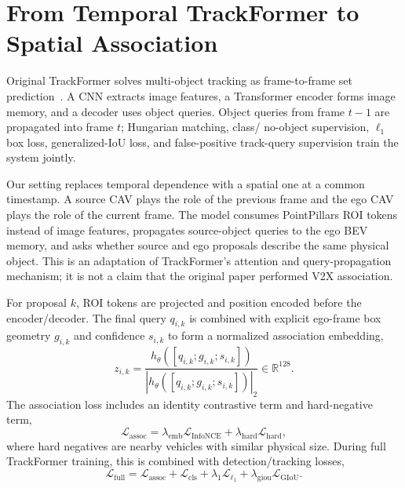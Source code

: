 \documentclass[11pt]{article}
\begin{document}
\section{From Temporal TrackFormer to Spatial Association}

Original TrackFormer solves multi-object tracking as frame-to-frame set
prediction~\cite{trackformer}. A CNN extracts image features, a Transformer
encoder forms image memory, and a decoder uses object queries. Object queries
from frame $t-1$ are propagated into frame $t$; Hungarian matching, class/
no-object supervision, $\ell_1$ box loss, generalized-IoU loss, and
false-positive track-query supervision train the system jointly.

Our setting replaces temporal dependence with a spatial one at a common
timestamp. A source CAV plays the role of the previous frame and the ego CAV
plays the role of the current frame. The model consumes PointPillars ROI tokens
instead of image features, propagates source-object queries to the ego BEV
memory, and asks whether source and ego proposals describe the same physical
object. This is an adaptation of TrackFormer's attention and query-propagation
mechanism; it is not a claim that the original paper performed V2X association.

For proposal $k$, ROI tokens are projected and position encoded before the
encoder/decoder. The final query $q_{i,k}$ is combined with explicit ego-frame
box geometry $g_{i,k}$ and confidence $s_{i,k}$ to form a normalized
association embedding,
\begin{equation}
 z_{i,k} = \frac{h_\theta([q_{i,k};g_{i,k};s_{i,k}])}
 {|h_\theta([q_{i,k};g_{i,k};s_{i,k}])|_2}\in\mathbb{R}^{128}.
\end{equation}
The association loss includes an identity contrastive term and hard-negative
term,
\begin{equation}
 \mathcal{L}_{\mathrm{assoc}} =
 \lambda_{\mathrm{emb}}\mathcal{L}_{\mathrm{InfoNCE}}+
 \lambda_{\mathrm{hard}}\mathcal{L}_{\mathrm{hard}},
\end{equation}
where hard negatives are nearby vehicles with similar physical size. During
full TrackFormer training, this is combined with detection/tracking losses,
\begin{equation}
 \mathcal{L}_{\mathrm{full}}=\mathcal{L}_{\mathrm{assoc}}+
 \mathcal{L}_{\mathrm{cls}}+\lambda_1\mathcal{L}_{\ell_1}+
 \lambda_{\mathrm{giou}}\mathcal{L}_{\mathrm{GIoU}}.
\end{equation}
\end{document}
